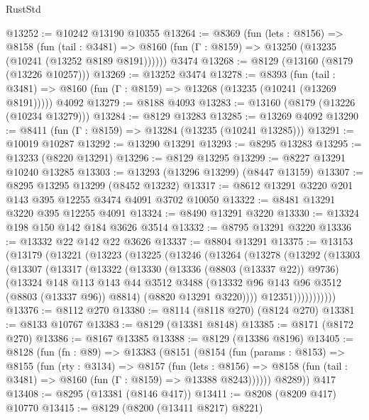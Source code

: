 \begin{lexlean}{RustStd}
\begin{coremodule}
@13252 := @10242 @13190 @10355
@13264 := @8369
    (fun (lets : @8156) =>
    @8158
      (fun (tail : @3481) =>
      @8160 (fun (Γ : @8159) => @13250 (@13235 (@10241 (@13252 @8189 @8191))))))
    @3474
@13268 := @8129 (@13160 (@8179 (@13226 @10257)))
@13269 := @13252 @3474
@13278 := @8393
    (fun (tail : @3481) => @8160 (fun (Γ : @8159) => @13268 (@13235 (@10241 (@13269 @8191)))))
    @4092
@13279 := @8188 @4093
@13283 := @13160 (@8179 (@13226 (@10234 @13279)))
@13284 := @8129 @13283
@13285 := @13269 @4092
@13290 := @8411 (fun (Γ : @8159) => @13284 (@13235 (@10241 @13285)))
@13291 := @10019 @10287
@13292 := @13290 @13291
@13293 := @8295 @13283
@13295 := @13233 (@8220 @13291)
@13296 := @8129 @13295
@13299 := @8227 @13291 @10240 @13285
@13303 := @13293 (@13296 @13299) (@8447 @13159)
@13307 := @8295 @13295 @13299 (@8452 @13232)
@13317 := @8612 @13291 @3220 @201 @143 @395 @12255 @3474 @4091 @3702 @10050
@13322 := @8481 @13291 @3220 @395 @12255 @4091
@13324 := @8490 @13291 @3220
@13330 := @13324 @198 @150 @142 @184 @3626 @3514
@13332 := @8795 @13291 @3220
@13336 := @13332 @22 @142 @22 @3626
@13337 := @8804 @13291
@13375 := @13153
    (@13179
      (@13221
        (@13223
          (@13225
            (@13246
              (@13264
                (@13278
                  (@13292
                    (@13303
                      (@13307
                        (@13317
                          (@13322
                            (@13330
                              (@13336 (@8803 (@13337 @22)) @9736)
                              (@13324
                                @148
                                @113
                                @143
                                @44
                                @3512
                                @3488
                                (@13332 @96 @143 @96 @3512 (@8803 (@13337 @96)) @8814)
                                (@8820 @13291 @3220))))
                          @12351)))))))))))
@13376 := @8112 @270
@13380 := @8114 (@8118 @270) (@8124 @270)
@13381 := @8133 @10767
@13383 := @8129 (@13381 @8148)
@13385 := @8171 (@8172 @270)
@13386 := @8167 @13385
@13388 := @8129 (@13386 @8196)
@13405 := @8128
    (fun (fn : @89) =>
    @13383
      (@8151
        (@8154
          (fun (params : @8153) =>
          @8155
            (fun (rty : @3134) =>
            @8157
              (fun (lets : @8156) =>
              @8158 (fun (tail : @3481) => @8160 (fun (Γ : @8159) => @13388 @8243))))))
        @8289))
    @417
@13408 := @8295 (@13381 (@8146 @417))
@13411 := @8208 (@8209 @417) @10770
@13415 := @8129 (@8200 (@13411 @8217) @8221)

\end{coremodule}
\end{lexlean}
